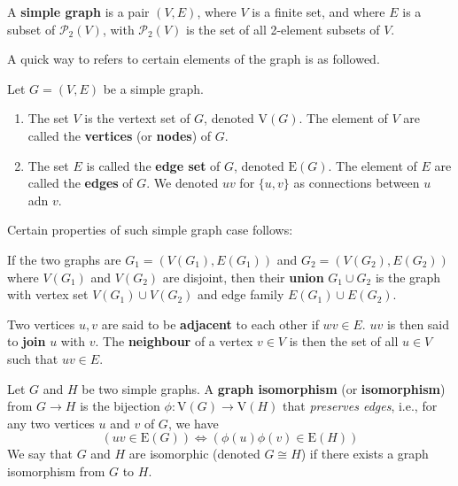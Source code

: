 \begin{definition}[Graph]
    A \textbf{simple graph} is a pair $(V,E)$, where $V$ is a finite set, and where $E$ is a subset of $\mathcal{P}_{2}(V)$, with $\mathcal{P}_{2}(V)$ is the set of all 2-element subsets of $V$.
\end{definition}

A quick way to refers to certain elements of the graph is as followed.

\begin{definition}[Notations]
    Let $G=(V,E)$ be a simple graph. 
    \begin{enumerate}[itemsep=1pt,topsep=1pt]
        \item The set $V$ is the vertext set of $G$, denoted $\mathrm{V}(G)$. The element of $V$ are called the \textbf{vertices} (or \textbf{nodes}) of $G$. 
        \item The set $E$ is called the \textbf{edge set} of $G$, denoted $\mathrm{E}(G)$. The element of $E$ are called the \textbf{edges} of $G$.  We denoted $uv$ for $\{u, v\}$ as connections between $u$ adn $v$.
    \end{enumerate}
\end{definition}

Certain properties of such simple graph case follows: 

\begin{definition}[Connectedness]
    If the two graphs are $G_{1}=(V(G_{1}),E(G_{1}))$ and $G_{2}=(V(G_{2}),E(G_{2}))$ where $V(G_{1})$ and $V(G_{2})$ are disjoint, then their \textbf{union} $G_{1}\cup G_{2}$ is the graph with vertex set $V(G_{1})\cup V(G_{2})$ and edge family $E(G_{1})\cup E(G_{2})$. 
\end{definition}

\begin{definition}[Adjacency]
    Two vertices $u,v$ are said to be \textbf{adjacent} to each other if $wv\in E$. $uv$ is then said to \textbf{join} $u$ with $v$. The \textbf{neighbour} of a vertex $v\in V$ is then the set of all $u\in V$ such that $uv\in E$. 
\end{definition}

\begin{definition}
    Let $G$ and $H$ be two simple graphs. A \textbf{graph isomorphism} (or \textbf{isomorphism}) from $G\to H$ is the bijection $\phi: \mathrm{V}(G)\to \mathrm{V}(H)$ that \textit{preserves edges}, i.e., for any two vertices $u$ and $v$ of $G$, we have \begin{equation}
        (uv \in \mathrm{E}(G)) \iff (\phi (u)\phi (v) \in \mathrm{E}(H))
    \end{equation} We say that $G$ and $H$ are isomorphic (denoted $G \cong H$) if there exists a graph isomorphism from $G$ to $H$. 
\end{definition}

